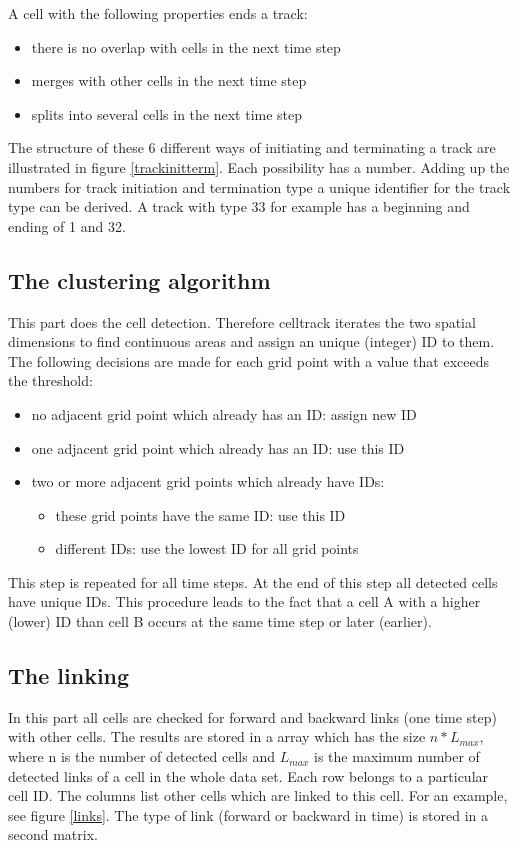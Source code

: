 \documentclass{scrartcl}
\begin{document}
 A cell with the following properties ends a track:
\begin{itemize}
	\item there is no overlap with cells in the next time step
	\item merges with other cells in the next time step
	\item splits into several cells in the next time step
\end{itemize}
The structure of these 6 different ways of initiating and terminating a track are illustrated in figure \ref{trackinitterm}. Each possibility has a number. Adding up the numbers for track initiation and termination type a unique identifier for the track type can be derived. A track with type 33 for example has a beginning and ending of 1 and 32. 

\subsection{The clustering algorithm}
This part does the cell detection. Therefore celltrack iterates the two spatial dimensions to find continuous areas and assign an unique (integer) ID to them. The following decisions are made for each grid point with a value that exceeds the threshold:
\begin{itemize}
	\item no adjacent grid point which already has an ID: assign new ID
	\item one adjacent grid point which already has an ID: use this ID
	\item two or more adjacent grid points which already have  IDs:
	\begin{itemize}
		\item these grid points have the same ID: use this ID
		\item different IDs: use the lowest ID for all grid points
	\end{itemize}
\end{itemize}
This step is repeated for all time steps. At the end of this step all detected cells have unique IDs. This procedure leads to the fact that a cell A with a higher (lower) ID than cell B occurs at the same time step or later (earlier).

\subsection{The linking}
In this part all cells are checked for forward and backward links (one time step) with other cells. The results are stored in a array which has the size $n * L_{max}$, where n is the number of detected cells and $L_{max}$ is the maximum number of detected links of a cell in the whole data set. Each row belongs to a particular cell ID. The columns list other cells which are linked to this cell. For an example, see figure \ref{links}. The type of link (forward or backward in time) is stored in a second matrix.
\end{document}
